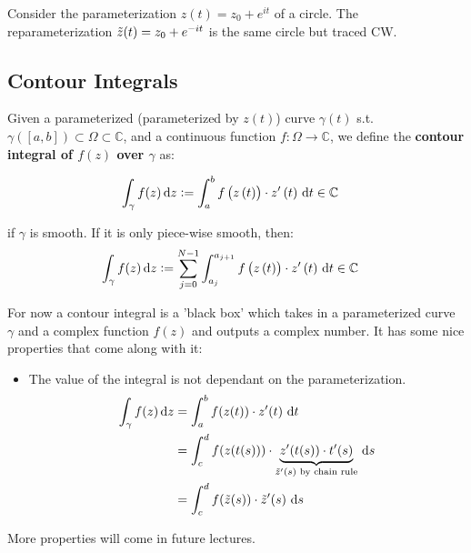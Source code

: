 \begin{example}[CW circle]
Consider the parameterization $z(t) = z_0+e^{it}$ of a circle. The reparameterization $\Tilde{z}(t) = z_0+e^{-it}$ is the same circle but traced CW.
\end{example}

\subsection{Contour Integrals}
\begin{definition}
Given a parameterized (parameterized by $z(t)$) curve $\gamma(t)$ s.t. $\gamma([a,b]) \subset \Omega \subset \mathbb{C}$, and a continuous function $f:\Omega \rightarrow \mathbb{C}$, we define the \textbf{contour integral of $f(z)$ over $\gamma$} as:

\begin{align*}
    \int_{\gamma} f(z)  \dif z & \vcentcolon= \int_a^bf \br{z\br{t}} \cdot z'\br{t} \,  \dif t \in \mathbb{C}
\end{align*}

if $\gamma$ is smooth. If it is only piece-wise smooth, then:
\begin{align*}
    \int_{\gamma} f(z)  \dif z & \vcentcolon= \sum_{j=0}^{N-1} \int_{a_j}^{a_{j+1}}f\br{z\br{t}} \cdot z'\br{t} \,  \dif t \in \mathbb{C}
\end{align*}

\end{definition}


For now a contour integral is a 'black box' which takes in a parameterized curve $\gamma$ and a complex function $f(z)$ and outputs a complex number. It has some nice properties that come along with it:

\begin{itemize}
    \item The value of the integral is not dependant on the parameterization.
    \begin{align*}
        \int_{\gamma} f(z)  \dif z &= \int_a^bf(z(t)) \cdot z'(t) \,  \dif t\\
        &= \int_c^d f(z(t(s))) \cdot \underbrace{z'(t(s)) \cdot t'(s)}_{\Tilde{z}'(s) \text{ by chain rule}} \,  \dif s\\
        &= \int_c^df(\Tilde{z}(s)) \cdot \Tilde{z}'(s) \,  \dif s
    \end{align*}
\end{itemize}

More properties will come in future lectures.

